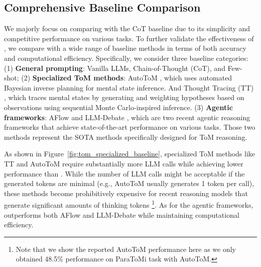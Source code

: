 \subsection{Comprehensive Baseline Comparison}
\label{sec:efficiency_analysis}
We majorly focus on comparing \protocolname with the CoT baseline due to its simplicity and competitive performance on various tasks.
To further validate the effectiveness of \protocolname, we compare with a wide range of baseline methods in terms of both accuracy and computational efficiency.
Specifically, we consider three baseline categories: (1) \textbf{General prompting}: Vanilla LLMs, Chain-of-Thought (CoT), and Few-shot; (2) \textbf{Specialized ToM methods}: 
AutoToM \citep{zhang2025autotomautomatedbayesianinverse}, which uses automated Bayesian inverse planning for mental state inference.
And Thought Tracing (TT) \citep{kim2025hypothesisdriventheoryofmindreasoninglarge}, which traces mental states by generating and weighting hypotheses based on observations using sequential Monte Carlo-inspired inference.
(3) \textbf{Agentic frameworks}: AFlow \citep{zhang2025aflow} and LLM-Debate \citep{du2024improvingfactualityreasoning}, which are two recent agentic reasoning frameworks that achieve state-of-the-art performance on various tasks.
Those two methods represent the SOTA methods specifically designed for ToM reasoning.

As shown in Figure~\ref{fig:tom_specialized_baseline}, specialized ToM methods like TT and AutoToM require substantially more LLM calls while achieving lower performance than \protocolname. While the number of LLM calls might be acceptable if the generated tokens are minimal (e.g., AutoToM usually generates 1 token per call), these methods become prohibitively expensive for recent reasoning models that generate significant amounts of thinking tokens
\footnote{Note that we show the reported AutoToM performance here as we only obtained 48.5\% performance on ParaToMi task with AutoToM.}.
As for the agentic frameworks, \protocolname outperforms both AFlow and LLM-Debate while maintaining computational efficiency.